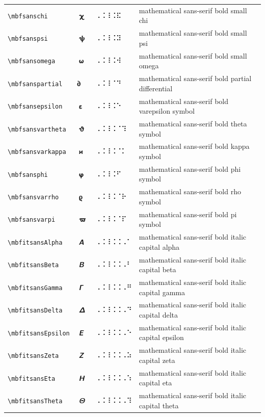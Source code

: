 \documentclass[oneside]{article}
\begin{document}
\begin{longtable}{llll}
\verb|\mbfsanschi| & $\mbfsanschi$ &  ⠠⠨⠸⠨⠯  & {mathematical sans-serif bold small chi} \\[2ex]
\verb|\mbfsanspsi| & $\mbfsanspsi$ &  ⠠⠨⠸⠨⠽  & {mathematical sans-serif bold small psi} \\[2ex]
\verb|\mbfsansomega| & $\mbfsansomega$ &  ⠠⠨⠸⠨⠺  & {mathematical sans-serif bold small omega} \\[2ex]
\verb|\mbfsanspartial| & $\mbfsanspartial$ &  ⠠⠨⠸⠈⠙  & {mathematical sans-serif bold partial differential} \\[2ex]
\verb|\mbfsansepsilon| & $\mbfsansepsilon$ &  ⠠⠨⠸⠨⠑  & {mathematical sans-serif bold varepsilon symbol} \\[2ex]
\verb|\mbfsansvartheta| & $\mbfsansvartheta$ &  ⠠⠨⠸⠨⠈⠹  & {mathematical sans-serif bold theta symbol} \\[2ex]
\verb|\mbfsansvarkappa| & $\mbfsansvarkappa$ &  ⠠⠨⠸⠨⠈⠅  & {mathematical sans-serif bold kappa symbol} \\[2ex]
\verb|\mbfsansphi| & $\mbfsansphi$ &  ⠠⠨⠸⠨⠋  & {mathematical sans-serif bold phi symbol} \\[2ex]
\verb|\mbfsansvarrho| & $\mbfsansvarrho$ &  ⠠⠨⠸⠨⠈⠗  & {mathematical sans-serif bold rho symbol} \\[2ex]
\verb|\mbfsansvarpi| & $\mbfsansvarpi$ &  ⠠⠨⠸⠨⠈⠏  & {mathematical sans-serif bold pi symbol} \\[2ex]
\verb|\mbfitsansAlpha| & $\mbfitsansAlpha$ &  ⠠⠨⠸⠨⠨⠠⠁  & {mathematical sans-serif bold italic capital alpha} \\[2ex]
\verb|\mbfitsansBeta| & $\mbfitsansBeta$ &  ⠠⠨⠸⠨⠨⠠⠃  & {mathematical sans-serif bold italic capital beta} \\[2ex]
\verb|\mbfitsansGamma| & $\mbfitsansGamma$ &  ⠠⠨⠸⠨⠨⠠⠛  & {mathematical sans-serif bold italic capital gamma} \\[2ex]
\verb|\mbfitsansDelta| & $\mbfitsansDelta$ &  ⠠⠨⠸⠨⠨⠠⠙  & {mathematical sans-serif bold italic capital delta} \\[2ex]
\verb|\mbfitsansEpsilon| & $\mbfitsansEpsilon$ &  ⠠⠨⠸⠨⠨⠠⠑  & {mathematical sans-serif bold italic capital epsilon} \\[2ex]
\verb|\mbfitsansZeta| & $\mbfitsansZeta$ &  ⠠⠨⠸⠨⠨⠠⠵  & {mathematical sans-serif bold italic capital zeta} \\[2ex]
\verb|\mbfitsansEta| & $\mbfitsansEta$ &  ⠠⠨⠸⠨⠨⠠⠱  & {mathematical sans-serif bold italic capital eta} \\[2ex]
\verb|\mbfitsansTheta| & $\mbfitsansTheta$ &  ⠠⠨⠸⠨⠨⠠⠹  & {mathematical sans-serif bold italic capital theta} \\[2ex]

\end{longtable}
\end{document}
